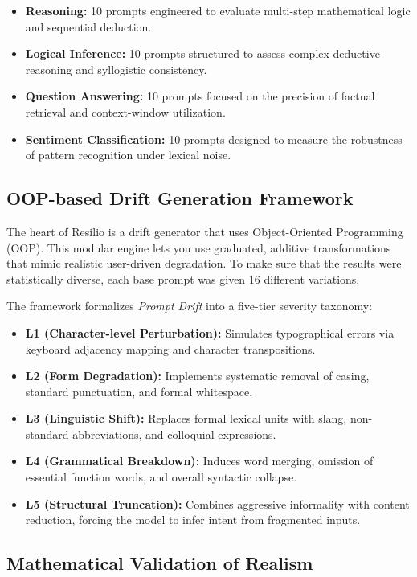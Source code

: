 \documentclass[conference]{IEEEtran}
\begin{document}
\begin{itemize}
\item \textbf{Reasoning:} 10 prompts engineered to evaluate multi-step mathematical logic and sequential deduction.
\item \textbf{Logical Inference:} 10 prompts structured to assess complex deductive reasoning and syllogistic consistency.
\item \textbf{Question Answering:} 10 prompts focused on the precision of factual retrieval and context-window utilization.
\item \textbf{Sentiment Classification:} 10 prompts designed to measure the robustness of pattern recognition under lexical noise.
\end{itemize}

\subsection{OOP-based Drift Generation Framework}

The heart of Resilio is a drift generator that uses Object-Oriented Programming (OOP). This modular engine lets you use graduated, additive transformations that mimic realistic user-driven degradation. To make sure that the results were statistically diverse, each base prompt was given 16 different variations.

The framework formalizes \textit{Prompt Drift} into a five-tier severity taxonomy:

\begin{itemize}
\item \textbf{L1 (Character-level Perturbation):} Simulates typographical errors via keyboard adjacency mapping and character transpositions.
\item \textbf{L2 (Form Degradation):} Implements systematic removal of casing, standard punctuation, and formal whitespace.
\item \textbf{L3 (Linguistic Shift):} Replaces formal lexical units with slang, non-standard abbreviations, and colloquial expressions.
\item \textbf{L4 (Grammatical Breakdown):} Induces word merging, omission of essential function words, and overall syntactic collapse.
\item \textbf{L5 (Structural Truncation):} Combines aggressive informality with content reduction, forcing the model to infer intent from fragmented inputs.
\end{itemize}

\subsection{Mathematical Validation of Realism}
\end{document}
